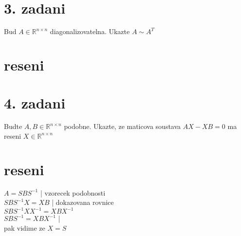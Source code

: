 \documentclass[a4paper]{article}
\begin{document}
\section*{3. zadani}
Bud $A\in \mathbb{R}^{n\times n}$ diagonalizovatelna. Ukazte $A \sim A^T$

\section*{reseni}













\section*{4. zadani}
Budte $A, B \in\mathbb{R}^{n\times n}$ podobne.
Ukazte, ze maticova soustava $AX - XB = 0$
ma reseni $X\in\mathbb{R}^{n\times n}$

\section*{reseni}
$A=SBS^{-1}$ | vzorecek podobnosti\\
$SBS^{-1}X = XB$ | dokazovana rovnice\\
$SBS^{-1}XX^{-1} = XBX^{-1}$\\
$SBS^{-1} = XBX^{-1}$ | \\
pak vidime ze $X=S$
\end{document}
